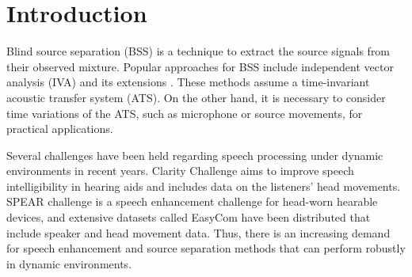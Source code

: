 \documentclass[sip,biber]{now-journal}
\begin{document}
\section{Introduction}\label{sec:intro}
Blind source separation (BSS) \cite{Makino:2018:ASS} is a technique to extract the source signals from their observed mixture.
Popular approaches for BSS include independent vector analysis (IVA) \cite{Kim:2006:ASLP,Hiroe:2006:ICA} and its extensions \cite{Kitamura:2016:ASLP,Nugraha:2020:SPL,Brendel:2020:SP}.
These methods assume a time-invariant acoustic transfer system (ATS).
On the other hand, it is necessary to consider time variations of the ATS, such as microphone or source movements, for practical applications.

Several challenges have been held regarding speech processing under dynamic environments in recent years.
Clarity Challenge \cite{Akeroyd:2023:ICASSP} aims to improve speech intelligibility in hearing aids and includes data on the listeners' head movements.
SPEAR challenge \cite{Guiraud:2022:IWAENC} is a speech enhancement challenge for head-worn hearable devices, and extensive datasets called EasyCom \cite{Donley:2021:arxiv} have been distributed that include speaker and head movement data.
Thus, there is an increasing demand for speech enhancement and source separation methods that can perform robustly in dynamic environments.
\end{document}
